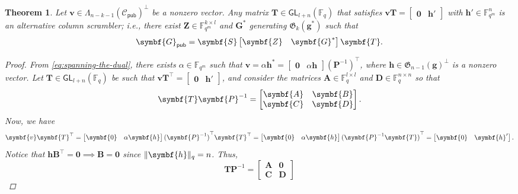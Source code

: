 \documentclass[version=last, paper=A4, parskip=half, oneside]{scrbook}
\theoremstyle{plain}
\newtheorem{theorem}{Theorem}
\theoremstyle{definition}
\theoremstyle{remark}
\renewcommand*{\vec}{\symbf}
\newcommand*{\mat}{\symbf}
\newcommand*{\trans}{\top}%
\newcommand*{\GL}{\ensuremath{\mathsf{GL}}}
\newcommand*{\pub}{\ensuremath{\mathsf{pub}}}
\newcommand*{\FF}{\ensuremath{\mathbb{F}}}
\newcommand*{\Gab}{\ensuremath{\mathfrak{G}}}
\DeclarePairedDelimiter{\norm}{\lVert}{\rVert}
\newcommand*{\normR}[2]{\ensuremath{\norm{#1}_{#2}}}
\begin{document}
\begin{theorem}
  Let \(\vec{v} \in {\Lambda_{n - k - 1}(\mathcal{C}_{\pub})}^{\perp}\) be a
  nonzero vector.  Any matrix \(\mat{T} \in \GL_{l + n}(\FF_q)\) that satisfies
  \(\vec{v} \mat{T} = \begin{bmatrix} \vec{0} & \vec{h}' \end{bmatrix}\) with
  \(\vec{h}' \in \FF_{q^m}^n\) is an alternative column scrambler; i.e., there
  exist \(\mat{Z} \in \FF_{q^m}^{k \times l}\) and \(\mat{G}^*\) generating
  \(\Gab_k(\vec{g}^*)\) such that
  \[
    \mat{G}_{\pub} = \mat{S} \begin{bmatrix} \mat{Z} & \mat{G}^* \end{bmatrix} \mat{T}\text.
  \]
  \begin{proof}
    From \cref{eq:spanning-the-dual}, there exists \(\alpha \in \FF_{q^m}\) such
    that
    \(\vec{v} = \alpha \vec{h}^* = \begin{bmatrix} \vec{0} & \alpha \vec{h} \end{bmatrix} {(\mat{P}^{-1})}^{\trans}\),
    where \(\vec{h} \in {\Gab_{n - 1}(\vec{g})}^{\perp}\) is a nonzero vector.
    Let \(\mat{T} \in \GL_{l + n}(\FF_q)\) be such that
    \(\vec{v} \mat{T}^{\trans} = \begin{bmatrix} \vec{0} & \vec{h}' \end{bmatrix}\),
    and consider the matrices \(\mat{A} \in \FF_q^{l \times l}\) and
    \(\mat{D} \in \FF_q^{n \times n}\) so that
    \[
      \mat{T} \mat{P}^{-1} =
      \begin{bmatrix}
        \mat{A} & \mat{B} \\
        \mat{C} & \mat{D}
      \end{bmatrix}\text.
    \]
    Now, we have
    \[
      \vec{v} \mat{T}^{\trans} =
      \begin{bmatrix} \vec{0} & \alpha \vec{h} \end{bmatrix}
      {(\mat{P}^{-1})}^{\trans} \mat{T}^{\trans} =
      \begin{bmatrix} \vec{0} & \alpha \vec{h} \end{bmatrix}
      {(\mat{P}^{-1} \mat{T})}^{\trans} =
      \begin{bmatrix} \vec{0} & \vec{h}' \end{bmatrix}\text.
    \]
    Notice that
    \(\vec{h} \mat{B}^{\trans} = \vec{0} \implies \mat{B} = \mat{0}\) since
    \(\normR{\vec{h}}{q} = n\).  Thus,
    \[
      \mat{T} \mat{P}^{-1} =
      \begin{bmatrix} \mat{A} & \mat{0} \\ \mat{C} & \mat{D} \end{bmatrix}
\]
\end{proof}
\end{theorem}
\end{document}
